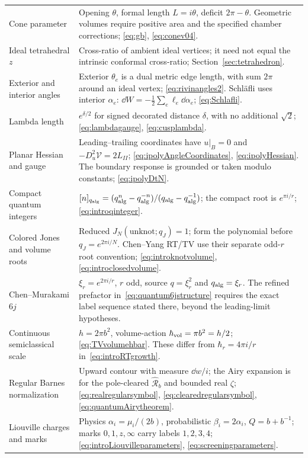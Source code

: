 \begin{longtable}{@{}>{\raggedright\arraybackslash}p{}
 >{\raggedright\arraybackslash}p{}@{}}
Cone parameter & Opening $\theta$, formal length $L=i\theta$, deficit $2\pi-\theta$. Geometric volumes require positive area and the specified chamber corrections; \eqref{eq:gb}, \eqref{eq:conev04}.\\
Ideal tetrahedral $z$ & Cross-ratio of ambient ideal vertices; it need not equal the intrinsic conformal cross-ratio; Section~\ref{sec:tetrahedron}.\\
Exterior and interior angles & Exterior $\theta_e$ is a dual metric edge length, with sum $2\pi$ around an ideal vertex; \eqref{eq:rivinangles2}. Schl\"afli uses interior $\alpha_e$: $\dd W=-\frac12\sum_e\ell_e\dd\alpha_e$; \eqref{eq:Schlafli}.\\
Lambda length & $e^{\delta/2}$ for signed decorated distance $\delta$, with no additional $\sqrt2$; \eqref{eq:lambdagauge}, \eqref{eq:cusplambda}.\\
Planar Hessian and gauge & Leading--trailing coordinates have $u|_B=0$ and $-D_u^2\mathcal V=2L_{II}$; \eqref{eq:ipolyAngleCoordinates}, \eqref{eq:ipolyHessian}. The boundary response is grounded or taken modulo constants; \eqref{eq:ipolyDtN}.\\
Compact quantum integers & $[n]_{q_{\rm alg}}=(q_{\rm alg}^n-q_{\rm alg}^{-n})/(q_{\rm alg}-q_{\rm alg}^{-1})$; the compact root is $e^{\pi i/r}$; \eqref{eq:introqinteger}.\\
Colored Jones and volume roots & Reduced $J_N(\text{unknot};q_J)=1$; form the polynomial before $q_J=e^{2\pi i/N}$. Chen--Yang RT/TV use their separate odd-$r$ root convention; \eqref{eq:introknotvolume}, \eqref{eq:introclosedvolume}.\\
Chen--Murakami $6j$ & $\xi_r=e^{2\pi i/r}$, $r$ odd, source $q=\xi_r^2$ and $q_{\rm alg}=\xi_r$. The refined prefactor in~\eqref{eq:quantum6jstructure} requires the exact label sequence stated there, beyond the leading-limit hypotheses.\\
Continuous semiclassical scale & $h=2\pi b^2$, volume-action $\hbar_{\rm vol}=\pi b^2=h/2$; \eqref{eq:TVvolumehbar}. These differ from $\hbar_r=4\pi i/r$ in~\eqref{eq:introRTgrowth}.\\
Regular Barnes normalization & Upward contour with measure $\dd w/i$; the Airy expansion is for the pole-cleared $\widehat{\mathcal R}_b$ and bounded real $\zeta$; \eqref{eq:realregularsymbol}, \eqref{eq:clearedregularsymbol}, \eqref{eq:quantumAirytheorem}.\\
Liouville charges and marks & Physics $\alpha_i=\mu_i/(2b)$, probabilistic $\beta_i=2\alpha_i$, $Q=b+b^{-1}$; marks $0,1,z,\infty$ carry labels $1,2,3,4$; \eqref{eq:introLiouvilleparameters}, \eqref{eq:screeningparameters}.\\

\end{longtable}
